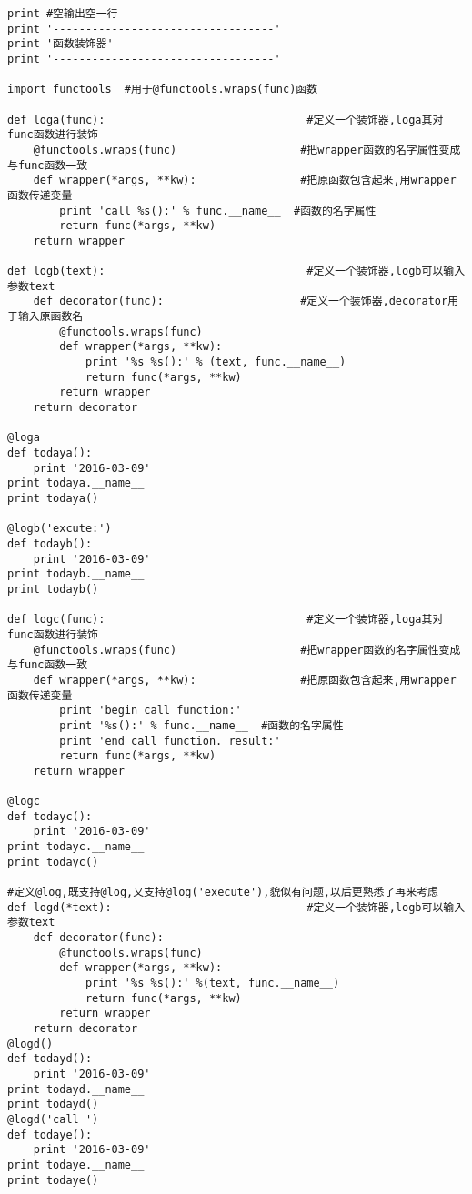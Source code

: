 \documentclass[twoside,11pt]{book}
\begin{document}
\begin{lstlisting}
print #空输出空一行
print '----------------------------------'
print '函数装饰器'
print '----------------------------------'

import functools  #用于@functools.wraps(func)函数

def loga(func):                               #定义一个装饰器,loga其对func函数进行装饰
    @functools.wraps(func)                   #把wrapper函数的名字属性变成与func函数一致
    def wrapper(*args, **kw):                #把原函数包含起来,用wrapper函数传递变量
        print 'call %s():' % func.__name__  #函数的名字属性
        return func(*args, **kw)
    return wrapper

def logb(text):                               #定义一个装饰器,logb可以输入参数text
    def decorator(func):                     #定义一个装饰器,decorator用于输入原函数名
        @functools.wraps(func)
        def wrapper(*args, **kw):
            print '%s %s():' % (text, func.__name__)
            return func(*args, **kw)
        return wrapper
    return decorator

@loga
def todaya():
    print '2016-03-09'
print todaya.__name__
print todaya()

@logb('excute:')
def todayb():
    print '2016-03-09'
print todayb.__name__
print todayb()

def logc(func):                               #定义一个装饰器,loga其对func函数进行装饰
    @functools.wraps(func)                   #把wrapper函数的名字属性变成与func函数一致
    def wrapper(*args, **kw):                #把原函数包含起来,用wrapper函数传递变量
        print 'begin call function:'
        print '%s():' % func.__name__  #函数的名字属性
        print 'end call function. result:'
        return func(*args, **kw)
    return wrapper

@logc
def todayc():
    print '2016-03-09'
print todayc.__name__
print todayc()

#定义@log,既支持@log,又支持@log('execute'),貌似有问题,以后更熟悉了再来考虑
def logd(*text):                              #定义一个装饰器,logb可以输入参数text
    def decorator(func):
        @functools.wraps(func)
        def wrapper(*args, **kw):
            print '%s %s():' %(text, func.__name__)
            return func(*args, **kw)
        return wrapper
    return decorator
@logd()
def todayd():
    print '2016-03-09'
print todayd.__name__
print todayd()
@logd('call ')
def todaye():
    print '2016-03-09'
print todaye.__name__
print todaye()

\end{lstlisting}
\end{document}
